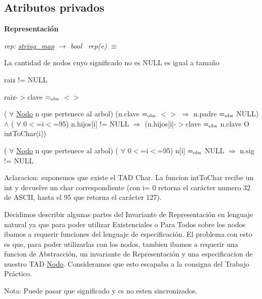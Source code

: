 \subsection*{Atributos privados}
\begin{Indent}{\bf Representación}\par
{\em rep\+: \hyperlink{classstring__map}{string\+\_\+map} $\to$ bool~\newline
 rep(e) $\equiv$
\begin{DoxyItemize}
\item La cantidad de nodos cuyo significado no es N\+U\+L\+L es igual a tamaño
\item raiz != N\+U\+L\+L
\item raiz-\/$>$clave $=_{\rm obs}$ $<$$>$
\item ( $\forall$ \hyperlink{structstring__map_1_1Nodo}{Nodo} n que pertenece al arbol) (n.\+clave $=_{\rm obs}$ $<$$>$ $\Rightarrow$ n.\+padre $=_{\rm obs}$ N\+U\+L\+L) $\land$ ( $\forall$ 0$<$=i$<$=95) n.\+hijos\mbox{[}i\mbox{]} != N\+U\+L\+L $\Rightarrow$ (n.\+hijos\mbox{[}i\mbox{]}-\/$>$clave $=_{\rm obs}$ n.\+clave O int\+To\+Char(i))
\item ( $\forall$ \hyperlink{structstring__map_1_1Nodo}{Nodo} n que pertenece al arbol) ( $\forall$ 0$<$=i$<$=95) n\mbox{[}i\mbox{]} $=_{\rm obs}$ N\+U\+L\+L $\Rightarrow$ n.\+sig != N\+U\+L\+L~\newline

\end{DoxyItemize}

Aclaracion\+: suponemos que existe el T\+A\+D Char. La funcion int\+To\+Char recibe un int y devuelve un char correspondiente (con i= 0 retorna el carácter numero 32 de A\+S\+C\+I\+I, hasta el 95 que retorna el carácter 127).

Decidimos describir algunas partes del Invariante de Representación en lenguaje natural ya que para poder utilizar Existenciales o Para Todos sobre los nodos ibamos a requerir funciones del lenguaje de especificación. El problema con esto es que, para poder utilizarlas con los nodos, tambien ibamos a requerir una funcion de Abstracción, un invariante de Representación y una especificacion de nuestro T\+A\+D \hyperlink{structstring__map_1_1Nodo}{Nodo}. Consideramos que esto escapaba a la consigna del Trabajo Práctico.~\newline


Nota\+: Puede pasar que significado y cs no esten sincronizados.~\newline


}
\end{Indent}
